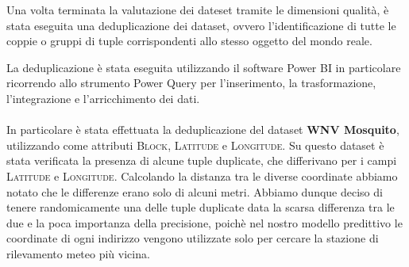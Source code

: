 Una volta terminata la valutazione dei dateset tramite le dimensioni qualità, è stata eseguita una deduplicazione dei dataset, ovvero l'identificazione di tutte le coppie o gruppi di tuple corrispondenti allo stesso oggetto del mondo reale.

La deduplicazione è stata eseguita utilizzando il software Power BI in particolare ricorrendo allo strumento Power Query per l'inserimento, la trasformazione, l'integrazione e l'arricchimento dei dati.
\\\\	
In particolare è stata effettuata la deduplicazione del dataset \textbf{WNV Mosquito}, utilizzando come attributi \textsc{Block}, \textsc{Latitude} e \textsc{Longitude}. 
Su questo dataset è stata verificata la presenza di alcune tuple duplicate, che differivano per i campi \textsc{Latitude} e \textsc{Longitude}. Calcolando la distanza tra le diverse coordinate abbiamo notato che le differenze erano solo di alcuni metri.
Abbiamo dunque deciso di tenere randomicamente una delle tuple duplicate data la scarsa differenza tra le due e la poca importanza della precisione, poichè nel nostro modello predittivo le coordinate di ogni indirizzo vengono utilizzate solo per cercare la stazione di rilevamento meteo più vicina.

